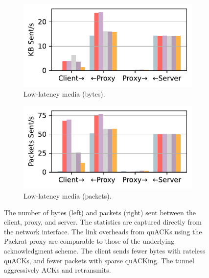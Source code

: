 \begin{figure}[ht]
\begin{minipage}[t]{0.68\textwidth}
    \begin{subfigure}[b]{0.49\linewidth}
        \centering
        \includegraphics[width=\linewidth]{packrat/figures/network_stats_media_tx_bytes.pdf}
        \caption{Low-latency media (bytes).}
        \label{fig:packrat:link-overheads:media-bytes}
    \end{subfigure}
    \begin{subfigure}[b]{0.49\linewidth}
        \centering
        \includegraphics[width=\linewidth]{packrat/figures/network_stats_media_tx_packets.pdf}
        \caption{Low-latency media (packets).}
        \label{fig:packrat:link-overheads:media-packets}
    \end{subfigure}
    
    \caption{The number of bytes (left) and packets (right) sent between the
     client, proxy, and server. The statistics are captured directly from the
     network interface. The link overheads from quACKs using the Packrat proxy are
     comparable to those of the underlying acknowledgment scheme. The client
     sends fewer bytes with rateless quACKs, and fewer packets with sparse
     quACKing. The tunnel aggressively ACKs and retransmits.}
    \label{fig:packrat:link-overheads}
\end{minipage}
\end{figure}